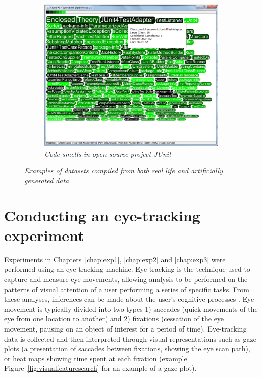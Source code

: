 \begin{figure}[!htb]
\begin{subfigure}{.5\textwidth}
  \centering
  \includegraphics{exp3.png}
  \caption{\textit{Code smells in open source project JUnit}}
\end{subfigure}%
  \caption{\textit{Examples of datasets compiled from both real life and artificially generated data}}
  \label{fig:datasets}
\end{figure}

\section{Conducting an eye-tracking experiment}\label{sect:eyetracker}

Experiments in Chapters~\ref{chap:exp1}, \ref{chap:exp2} and \ref{chap:exp3} were performed using an eye-tracking machine. Eye-tracking is the technique used to capture and measure eye movements, allowing analysis to be performed on the patterns of visual attention of a user performing a series of specific tasks. From these analyses, inferences can be made about the user's cognitive processes \citep{olsen10}. Eye-movement is typically divided into two types 1) saccades (quick movements of the eye from one location to another) and 2) fixations (cessation of the eye movement, pausing on an object of interest for a period of time). Eye-tracking data is collected and then interpreted through visual representations such as gaze plots (a presentation of saccades between fixations, showing the eye scan path), or heat maps showing time spent at each fixation (example Figure~\vref{fig:visualfeaturesearch} for an example of a gaze plot).

